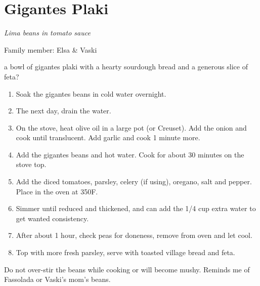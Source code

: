 \chapter{Gigantes Plaki}
\label{ch:gigantes-plaki}


\textit{Lima beans in tomato sauce}

Family member: Elsa \& Vaski


%
 a bowl of gigantes plaki with a hearty sourdough bread and a generous slice of feta?

\bigskip

\begin{enumerate}
    \item Soak the gigantes beans in cold water overnight.
    \item The next day, drain the water.
    \item On the stove, heat olive oil in a large pot (or Creuset). Add the onion and cook until translucent. Add garlic and cook 1 minute more.
    \item Add the gigantes beans and hot water. Cook for about 30 minutes on the stove top.
    \item Add the diced tomatoes, parsley, celery (if using), oregano, salt and pepper. Place in the oven at 350\degree F.
    \item Simmer until reduced and thickened, and can add the 1/4 cup extra water to get wanted consistency.
    \item After about 1 hour, check peas for doneness, remove from oven and let cool.
    \item Top with more fresh parsley, serve with toasted village bread and feta.
\end{enumerate}

Do not over-stir the beans while cooking or will become mushy.
Reminds me of Fassolada or Vaski's mom's beans.

